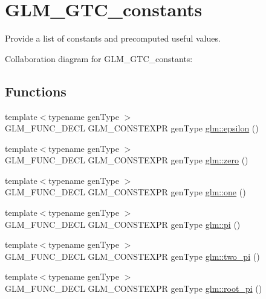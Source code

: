 \hypertarget{group__gtc__constants}{\section{G\-L\-M\-\_\-\-G\-T\-C\-\_\-constants}
\label{group__gtc__constants}
}


Provide a list of constants and precomputed useful values.  


Collaboration diagram for G\-L\-M\-\_\-\-G\-T\-C\-\_\-constants\-:
\subsection*{Functions}
\begin{DoxyCompactItemize}
\item 
{\footnotesize template$<$typename gen\-Type $>$ }\\G\-L\-M\-\_\-\-F\-U\-N\-C\-\_\-\-D\-E\-C\-L G\-L\-M\-\_\-\-C\-O\-N\-S\-T\-E\-X\-P\-R gen\-Type \hyperlink{group__gtc__constants_ga2a1e57fc5592b69cfae84174cbfc9429}{glm\-::epsilon} ()
\item 
{\footnotesize template$<$typename gen\-Type $>$ }\\G\-L\-M\-\_\-\-F\-U\-N\-C\-\_\-\-D\-E\-C\-L G\-L\-M\-\_\-\-C\-O\-N\-S\-T\-E\-X\-P\-R gen\-Type \hyperlink{group__gtc__constants_ga788f5a421fc0f40a1296ebc094cbaa8a}{glm\-::zero} ()
\item 
{\footnotesize template$<$typename gen\-Type $>$ }\\G\-L\-M\-\_\-\-F\-U\-N\-C\-\_\-\-D\-E\-C\-L G\-L\-M\-\_\-\-C\-O\-N\-S\-T\-E\-X\-P\-R gen\-Type \hyperlink{group__gtc__constants_ga39c2fb227631ca25894326529bdd1ee5}{glm\-::one} ()
\item 
{\footnotesize template$<$typename gen\-Type $>$ }\\G\-L\-M\-\_\-\-F\-U\-N\-C\-\_\-\-D\-E\-C\-L G\-L\-M\-\_\-\-C\-O\-N\-S\-T\-E\-X\-P\-R gen\-Type \hyperlink{group__gtc__constants_ga94bafeb2a0f23ab6450fed1f98ee4e45}{glm\-::pi} ()
\item 
{\footnotesize template$<$typename gen\-Type $>$ }\\G\-L\-M\-\_\-\-F\-U\-N\-C\-\_\-\-D\-E\-C\-L G\-L\-M\-\_\-\-C\-O\-N\-S\-T\-E\-X\-P\-R gen\-Type \hyperlink{group__gtc__constants_gaa5276a4617566abcfe49286f40e3a256}{glm\-::two\-\_\-pi} ()
\item 
{\footnotesize template$<$typename gen\-Type $>$ }\\G\-L\-M\-\_\-\-F\-U\-N\-C\-\_\-\-D\-E\-C\-L G\-L\-M\-\_\-\-C\-O\-N\-S\-T\-E\-X\-P\-R gen\-Type \hyperlink{group__gtc__constants_ga261380796b2cd496f68d2cf1d08b8eb9}{glm\-::root\-\_\-pi} ()

\end{DoxyCompactItemize}

